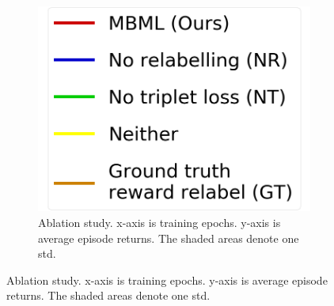 \begin{figure}[!t]
    \begin{minipage}{0.28\textwidth}
        \begin{figure}[H]
            \centering
            \includegraphics[width=\textwidth]{chapter_2/fig/legend_ablation.png}
            \caption{Ablation study.
                x-axis is training epochs.
                y-axis is average episode returns.
                The shaded areas denote one std.
            }\label{fig:ablation}
        \end{figure}
    \end{minipage}
    \hfill
    \addtocounter{figure}{-1}
    \begin{minipage}{0.70\textwidth}

\end{minipage}
\end{figure}
